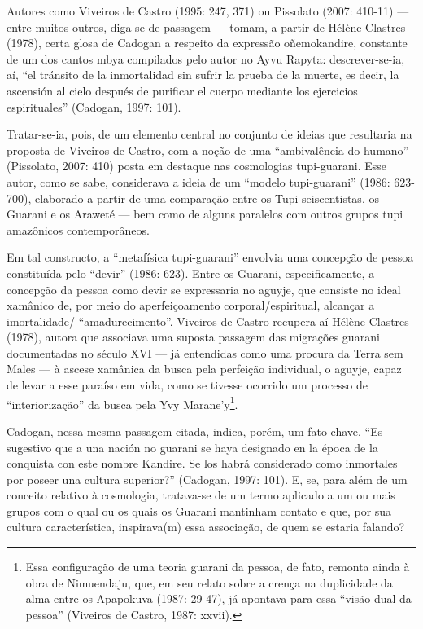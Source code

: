 Autores como Viveiros de Castro (1995: 247, 371) ou Pissolato (2007:
410-11) — entre muitos outros, diga-se de passagem — tomam, a partir de
Hélène Clastres (1978), certa glosa de Cadogan a respeito da expressão
oñemokandire, constante de um dos cantos mbya compilados pelo autor no
Ayvu Rapyta: descrever-se-ia, aí, ``el tránsito de la inmortalidad sin
sufrir la prueba de la muerte, es decir, la ascensión al cielo después
de purificar el cuerpo mediante los ejercicios espirituales'' (Cadogan,
1997: 101). 

Tratar-se-ia, pois, de um elemento central no conjunto de ideias que
resultaria na proposta de Viveiros de Castro, com a noção de uma
``ambivalência do humano'' (Pissolato, 2007: 410) posta em destaque nas
cosmologias tupi-guarani. Esse autor, como se sabe, considerava a ideia
de um ``modelo tupi-guarani'' (1986: 623-700), elaborado a partir de uma
comparação entre os Tupi seiscentistas, os Guarani e os Araweté — bem
como de alguns paralelos com outros grupos tupi amazônicos
contemporâneos.

Em tal constructo, a ``metafísica tupi-guarani'' envolvia uma concepção de
pessoa constituída pelo ``devir'' (1986: 623). Entre os Guarani,
especificamente, a concepção da pessoa como devir se expressaria no
aguyje, que consiste no ideal xamânico de, por meio do aperfeiçoamento
corporal/espiritual, alcançar a imortalidade/ ``amadurecimento''.
Viveiros de Castro recupera aí Hélène Clastres (1978), autora que
associava uma suposta passagem das migrações guarani documentadas no
século XVI — já entendidas como uma procura da Terra sem Males — à
ascese xamânica da busca pela perfeição individual, o aguyje, capaz de
levar a esse paraíso em vida, como se tivesse ocorrido um processo de
``interiorização'' da busca pela Yvy Marane’y\footnote{Essa configuração
de uma teoria guarani da pessoa, de fato, remonta ainda à obra de
Nimuendaju, que, em seu relato sobre a crença na duplicidade da alma
entre os Apapokuva (1987: 29-47), já apontava para essa ``visão dual da
pessoa'' (Viveiros de Castro, 1987: xxvii).}.

Cadogan, nessa mesma passagem citada, indica, porém, um fato-chave. ``Es
sugestivo que a una nación no guarani se haya designado en la época de
la conquista con este nombre Kandire. Se los habrá considerado como
inmortales por poseer una cultura superior?'' (Cadogan, 1997: 101). E,
se, para além de um conceito relativo à cosmologia, tratava-se de um
termo aplicado a um ou mais grupos com o qual ou os quais os Guarani
mantinham contato e que, por sua cultura característica, inspirava(m)
essa associação, de quem se estaria falando?

